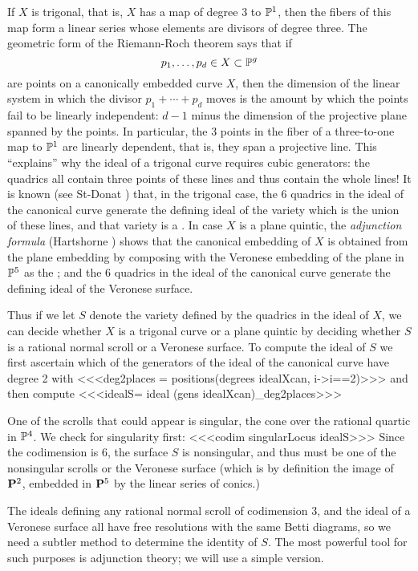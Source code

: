 If $X$ is trigonal, that is, $X$ has a map of degree 3 to $\P^1$,
then the fibers of this map form a linear series whose elements
are divisors of degree three. The geometric form
of the Riemann-Roch theorem says that if 
$$
p_1,\dots,p_d\in X\subset \P^g
$$
are points on a canonically embedded curve $X$,
then the dimension of the linear system in which the divisor
$p_1+\cdots+p_d$ moves is the amount by which the points fail
to be linearly independent: $d-1$ minus the dimension of the 
projective plane spanned by the points.
In particular, the 3 points in the fiber of a three-to-one
map to $\P^1$ are linearly dependent, that is,
they span a projective line.
This ``explains'' why the ideal of a
trigonal curve requires cubic generators: the quadrics all 
contain three points of these lines and thus contain the whole
lines! It is known (see St-Donat \cite{s-d}) that, in the 
trigonal case, the 6 quadrics in the ideal of the canonical curve
generate the defining ideal of the variety which is the union of these
lines, and that variety is a .
In case $X$ is a plane quintic, the {\it adjunction formula\/}
(Hartshorne \cite[II.8.20.3]{Hartshorne}) 
shows that the canonical embedding of $X$ is
obtained from the plane embedding by composing with the Veronese
embedding of the plane in $\P^5$ as the ; 
and the 6 quadrics in the ideal
of the canonical curve generate the defining ideal of the
Veronese surface. 

Thus if we let $S$ denote the variety defined by the quadrics
in the ideal of $X$, we can decide whether $X$ is a 
trigonal curve or a plane quintic by deciding whether $S$ is
a rational normal scroll or a Veronese surface.
To compute the ideal of $S$ we first ascertain which
of the generators of the ideal of the canonical curve
have degree 2 with
<<<deg2places = positions(degrees idealXcan, i->i=={2})>>>
and then compute
<<<idealS= ideal (gens idealXcan)_deg2places>>>

One of the scrolls that could appear is singular, the cone
over the rational quartic in $\P^4$. We check for singularity
{}first:
<<<codim singularLocus idealS>>>
Since the codimension is 6, the surface $S$ is nonsingular,
and thus must be one of the nonsingular scrolls or the Veronese
surface (which is by definition the image of ${\bf P}^2$, 
embedded in ${\bf P}^5$ by the linear series of conics.)

The ideals defining any rational normal
scroll of codimension 3, and the ideal
of a Veronese surface all have free resolutions with
the same Betti diagrams, so we need a subtler method
to determine the identity of $S$. The most powerful tool
{}for such purposes is adjunction theory; we will use a 
simple version. 

